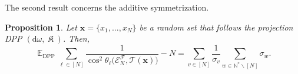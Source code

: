 \documentclass[twoside,11pt]{book}
\newtheorem{proposition}{Proposition}
\numberwithin{theorem}{chapter}
\numberwithin{definition}{chapter}
\numberwithin{proposition}{chapter}
\numberwithin{corollary}{chapter}
\numberwithin{example}{chapter}
\numberwithin{lemma}{chapter}
\numberwithin{assumption}{chapter}
\DeclareMathOperator{\DPP}{\mathrm{DPP}}
\DeclareMathOperator{\EX}{\mathbb{E}}
\DeclareMathOperator*{\KDPP}{\mathfrak{K}}
\begin{document}
The second result concerns the additive symmetrization.

\begin{proposition}\label{prop:ex_dpp_sum_inv_cos}
Let $\bm{x} = \{x_{1}, \dots , x_{N}\}$ be a random set that follows the projection DPP $(\mathrm{d}\omega, \KDPP )$. Then,
\begin{equation}
\EX_{\DPP}  \sum\limits_{\ell \in [N]} \frac{1}{\cos^{2} \theta_{\ell} \bigg(\mathcal{E}^{\mathcal{F}}_{N}, \mathcal{T}(\bm{x}) \bigg)} -N =  \sum\limits_{v \in [N]} \frac{1}{\sigma_{v}} \sum\limits_{w \in \mathbb{N}^{*}\smallsetminus [N]} \sigma_{w}.
\end{equation}
\end{proposition}



\end{document}

